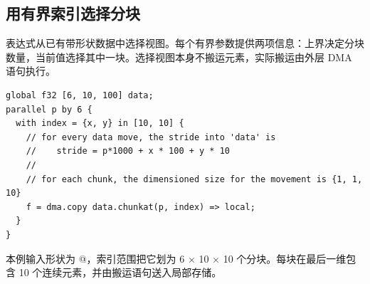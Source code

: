 \subsection*{用有界索引选择分块}

\co@chunkat@ 表达式从已有带形状数据中选择视图。每个有界参数提供两项信息：上界决定分块数量，当前值选择其中一块。选择视图本身不搬运元素，实际搬运由外层 DMA 语句执行。

\begin{lstlisting}[language=croqtile,caption={有界整数元组／整数与 chunkat 运算}]
global f32 [6, 10, 100] data;
parallel p by 6 {
  with index = {x, y} in [10, 10] {
    // for every data move, the stride into 'data' is
    //    stride = p*1000 + x * 100 + y * 10
    //
    // for each chunk, the dimensioned size for the movement is {1, 1, 10}
    f = dma.copy data.chunkat(p, index) => local;
  }
}
\end{lstlisting}

本例输入形状为 \co@[6, 10, 100]@，索引范围把它划为 6 × 10 × 10 个分块。每块在最后一维包含 10 个连续元素，并由搬运语句送入局部存储。
